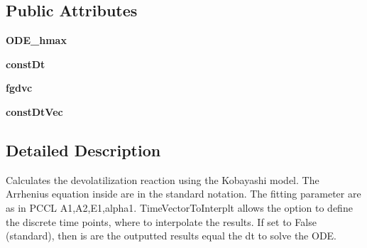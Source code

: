 \subsection*{\-Public \-Attributes}
\begin{DoxyCompactItemize}
\item 
\hypertarget{classModels_1_1KobayashiPCCL_a71167eaf1c943b108ca87c51ba8ba310}{{\bfseries \-O\-D\-E\-\_\-hmax}}\label{classModels_1_1KobayashiPCCL_a71167eaf1c943b108ca87c51ba8ba310}

\item 
\hypertarget{classModels_1_1KobayashiPCCL_aa6387b8966d48c2b1c827136ef4a931b}{{\bfseries const\-Dt}}\label{classModels_1_1KobayashiPCCL_aa6387b8966d48c2b1c827136ef4a931b}

\item 
\hypertarget{classModels_1_1KobayashiPCCL_a99a9c55bdcc2446d86ac8533566ec76f}{{\bfseries fgdvc}}\label{classModels_1_1KobayashiPCCL_a99a9c55bdcc2446d86ac8533566ec76f}

\item 
\hypertarget{classModels_1_1Model_a3f71983de5f8b86bec47929213b900ec}{{\bfseries const\-Dt\-Vec}}\label{classModels_1_1Model_a3f71983de5f8b86bec47929213b900ec}

\end{DoxyCompactItemize}


\subsection{\-Detailed \-Description}
\begin{DoxyVerb}Calculates the devolatilization reaction using the Kobayashi model. The Arrhenius equation inside are in the standard notation. The fitting parameter are as in PCCL A1,A2,E1,alpha1. TimeVectorToInterplt allows the option to define the discrete time points, where to interpolate the results. If set to False (standard), then is are the outputted results equal the dt to solve the ODE.\end{DoxyVerb}
 

